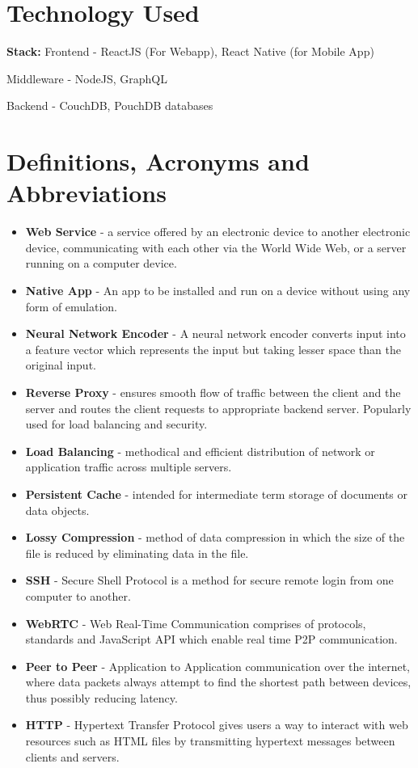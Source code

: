 \section{Technology Used}
\textbf{Stack:} 
Frontend - ReactJS (For Webapp), React Native (for Mobile App)

Middleware - NodeJS, GraphQL

Backend - CouchDB, PouchDB databases 

\section{Definitions, Acronyms and Abbreviations}
\begin{itemize}
    \item \textbf{Web Service} - a service offered by an electronic device to another electronic device, 
    communicating with each other via the World Wide Web, or a server running on a computer device.
    \item \textbf{Native App} - An app to be installed and run on a device without using any form of emulation.
    \item \textbf{Neural Network Encoder} - A neural network encoder converts input into a feature vector 
    which represents the input but taking lesser space than the original input.
    \item \textbf{Reverse Proxy} - ensures smooth flow of traffic between the client and the server 
    and routes the client requests to appropriate backend server. Popularly used for load balancing and security.
    \item \textbf{Load Balancing} - methodical and efficient distribution of network or application traffic 
    across multiple servers.
    \item \textbf{Persistent Cache} - intended for intermediate term storage of documents or data objects.
    \item \textbf{Lossy Compression} - method of data compression in which the size of the file 
    is reduced by eliminating data in the file.
    \item \textbf{SSH} - Secure Shell Protocol is a method for secure remote login from 
    one computer to another.
    \item \textbf{WebRTC} - Web Real-Time Communication comprises of protocols, standards and 
    JavaScript API which enable real time P2P communication.
    \item \textbf{Peer to Peer} - Application to Application communication over the internet, 
    where data packets always attempt to find the shortest path between devices, thus possibly reducing latency.
    \item \textbf{HTTP} - Hypertext Transfer Protocol gives users a way to interact with web resources 
    such as HTML files by transmitting hypertext messages between clients and servers.
\end{itemize}

